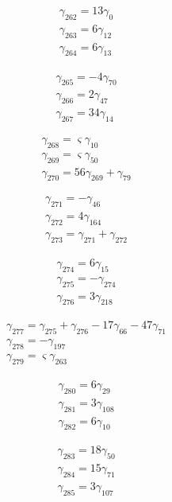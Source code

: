 \[\begin{aligned}\gamma_{262}=13 \gamma_{0}\\ \gamma_{263}=6 \gamma_{12}\\ \gamma_{264}=6 \gamma_{13}\end{aligned}\]

\[\begin{aligned}\gamma_{265}=- 4 \gamma_{70}\\ \gamma_{266}=2 \gamma_{47}\\ \gamma_{267}=34 \gamma_{14}\end{aligned}\]

\[\begin{aligned}\gamma_{268}=\varsigma  \gamma_{10}\\ \gamma_{269}=\varsigma  \gamma_{50}\\ \gamma_{270}=56 \gamma_{269} + \gamma_{79}\end{aligned}\]

\[\begin{aligned}\gamma_{271}=- \gamma_{46}\\ \gamma_{272}=4 \gamma_{164}\\ \gamma_{273}=\gamma_{271} + \gamma_{272}\end{aligned}\]

\[\begin{aligned}\gamma_{274}=6 \gamma_{15}\\ \gamma_{275}=- \gamma_{274}\\ \gamma_{276}=3 \gamma_{218}\end{aligned}\]

\[\begin{aligned}\gamma_{277}=\gamma_{275} + \gamma_{276} - 17 \gamma_{66} - 47 \gamma_{71}\\ \gamma_{278}=- \gamma_{197}\\ \gamma_{279}=\varsigma  \gamma_{263}\end{aligned}\]

\[\begin{aligned}\gamma_{280}=6 \gamma_{29}\\ \gamma_{281}=3 \gamma_{108}\\ \gamma_{282}=6 \gamma_{10}\end{aligned}\]

\[\begin{aligned}\gamma_{283}=18 \gamma_{50}\\ \gamma_{284}=15 \gamma_{71}\\ \gamma_{285}=3 \gamma_{107}\end{aligned}\]

